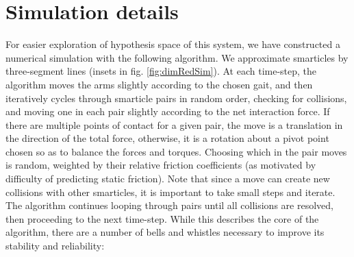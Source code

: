\documentclass[reprint,prx]{revtex4-1}
\renewcommand{\=}[1]{\stackrel{#1}{=}} %
\renewcommand{\(}{\left (}
\renewcommand{\)}{\right  )}
\renewcommand{\[}{\left [}
\renewcommand{\]}{\right ]}
\newcommand{\<}{\left <}
\renewcommand{\>}{\right >}
\theoremstyle{definition}
\theoremstyle{remark}
\begin{document}
\section{Simulation details} \label{app:simulation}
For easier exploration of hypothesis space of this system, we have constructed a numerical simulation with the following algorithm. We approximate smarticles by three-segment lines (insets in fig. \ref{fig:dimRedSim}). At each time-step, the algorithm moves the arms slightly according to the chosen gait, and then iteratively cycles through smarticle pairs in random order, checking for collisions, and moving one in each pair slightly according to the net interaction force. If there are multiple points of contact for a given pair, the move is a translation in the direction of the total force, otherwise, it is a rotation about a pivot point chosen so as to balance the forces and torques. Choosing which in the pair moves is random, weighted by their relative friction coefficients (as motivated by difficulty of predicting static friction). Note that since a move can create new collisions with other smarticles, it is important to take small steps and iterate. The algorithm continues looping through pairs until all collisions are resolved, then proceeding to the next time-step. While this describes the core of the algorithm, there are a number of bells and whistles necessary to improve its stability and reliability:
\end{document}
